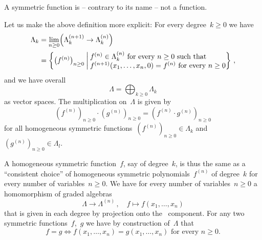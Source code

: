 \documentclass[a4paper,11pt]{scrartcl}
\begin{document}
\begin{warning}
  A symmetric function is -- contrary to its name -- not a function.
\end{warning}

Let us make the above definition more explicit:
For every degree~$k \geq 0$ we have
\begin{align*}
  \Lambda_k
  &=
  \lim_{n \geq 0}
  \Bigl( \Lambda^{(n+1)}_k \to \Lambda^{(n)}_k \Bigr)
  \\
  &=
  \left\{
    \bigl( f^{(n)} \bigr)_{n \geq 0}
    \suchthat*
    \begin{tabular}{@{}l@{}}
      $f^{(n)} \in \Lambda^{(n)}_k$ for every~$n \geq 0$ such that \\
      $f^{(n+1)}(x_1, \dotsc, x_n, 0) = f^{(n)}$ for every~$n \geq 0$
    \end{tabular}
  \right\} \,,
\end{align*}
and we have overall
\[
  \Lambda
  =
  \bigoplus_{k \geq 0} \Lambda_k
\]
as vector spaces.
The multiplication on~$\Lambda$ is given by
\[
  (f^{(n)})_{n \geq 0}
  \cdot
  (g^{(n)})_{n \geq 0}
  =
  (f^{(n)} \cdot g^{(n)})_{n \geq 0}
\]
for all homogeneous symmetric functions~$(f^{(n)})_{n \geq 0} \in \Lambda_k$ and~$(g^{(n)})_{n \geq 0} \in \Lambda_l$.

A homogeneous symmetric function~$f$, say of degree~$k$, is thus the same as a \enquote{consistent choice} of homogeneous symmetric polynomials~$f^{(n)}$ of degree~$k$ for every number of variables~$n \geq 0$.
We have for every number of variables~$n \geq 0$ a homomorphism of graded algebras
\[
  \Lambda
  \to
  \Lambda^{(n)} \,,
  \quad
  f
  \mapsto
  f(x_1, \dotsc, x_n)
\]
that is given in each degree by projection onto the~ component.
For any two symmetric functions~$f$,~$g$ we have by construction of~$\Lambda$ that
\[
  f = g
  \iff
  \text{$f(x_1, \dotsc, x_n) = g(x_1, \dotsc, x_n)$ for every~$n \geq 0$.}
\]
\end{document}
